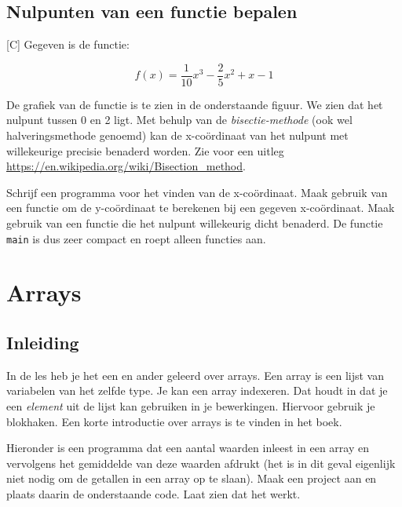 \documentclass[a4paper,10pt,fleqn,twoside]{article}
\begin{document}
\subsection{Nulpunten van een functie bepalen}[C]
Gegeven is de functie:

\begin{equation}
f(x) = \frac{1}{10}x^3 - \frac{2}{5}x^2 + x - 1
\end{equation}

De grafiek van de functie is te zien in de onderstaande figuur. We zien dat het nulpunt tussen 0 en 2 ligt. Met behulp van de \textsl{bisectie-methode} (ook wel halveringsmethode genoemd) kan de x-coördinaat van het nulpunt met willekeurige precisie benaderd worden. Zie voor een uitleg \url{https://en.wikipedia.org/wiki/Bisection_method}.

\begin{figure}[!ht]
\centering
{}
\end{figure}

Schrijf een programma voor het vinden van de x-coördinaat. Maak gebruik van een functie om de y-coördinaat te berekenen bij een gegeven x-coördinaat. Maak gebruik van een functie die het nulpunt willekeurig dicht benaderd. De functie \lstinline|main| is dus zeer compact en roept alleen functies aan.


\clearpage
\section{Arrays}

\subsection{Inleiding}
\label{sec:inleidingarray}
In de les heb je het een en ander geleerd over arrays.
Een array is een lijst van variabelen van het zelfde type. Je kan een array indexeren. Dat houdt in dat je een \textsl{element} uit de lijst kan gebruiken in je bewerkingen. Hiervoor gebruik je blokhaken. Een korte introductie over arrays is te vinden in het boek.

Hieronder is een programma dat een aantal waarden inleest in een array en vervolgens het gemiddelde van deze waarden afdrukt (het is in dit geval eigenlijk niet nodig om de getallen in een array op te slaan). Maak een project aan en plaats daarin de onderstaande code. Laat zien dat het werkt.
\end{document}
